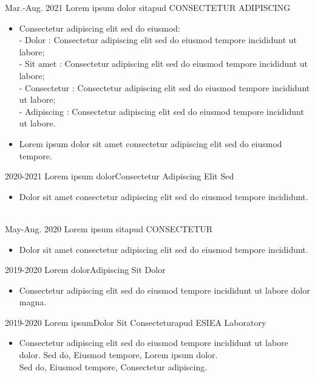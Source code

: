 %
%
%
\begin{experiences}
	\experience
	{Mar.-Aug. 2021} {Lorem ipsum dolor sit}{apud CONSECTETUR ADIPISCING}{} 
	{}{
		\begin{itemize}
			\item Consectetur adipiscing elit sed do eiusmod:
			\\- Dolor : Consectetur adipiscing elit sed do eiusmod tempore incididunt ut labore;
			\\- Sit amet : Consectetur adipiscing elit sed do eiusmod tempore incididunt ut labore;
			\\- Consectetur : Consectetur adipiscing elit sed do eiusmod tempore incididunt ut labore;
			\\- Adipiscing : Consectetur adipiscing elit sed do eiusmod tempore incididunt ut labore.
			\vspace{-0.3cm}\\
			\item Lorem ipsum dolor sit amet consectetur adipiscing elit sed do eiusmod tempore.
			\vspace{-0.25cm}\\
		\end{itemize}    
	} {}
	\experience
	{2020-2021} {Lorem ipsum dolor}{Consectetur Adipiscing Elit Sed}{}    
	{}{
		\begin{itemize}
			\item Dolor sit amet consectetur adipiscing elit sed do eiusmod tempore incididunt.
		\end{itemize}    
	} {}
	\vspace{-0.25cm}\\
	\experience
	{May-Aug. 2020} {Lorem ipsum sit}{apud CONSECTETUR}{}    
	{}{
		\begin{itemize}
			\item Dolor sit amet consectetur adipiscing elit sed do eiusmod tempore incididunt.
		\end{itemize}    
	} {}
	\experience
	{2019-2020} {Lorem dolor}{Adipiscing Sit Dolor}{}    
	{}{
		\begin{itemize}
			\item Consectetur adipiscing elit sed do eiusmod tempore incididunt ut labore dolor magna.
		\end{itemize}    
	} {}
	\experience
	{2019-2020} {Lorem ipsum}{Dolor Sit Consectetur}{apud ESIEA Laboratory}    
	{}{
		\begin{itemize}
			\item Consectetur adipiscing elit sed do eiusmod tempore incididunt ut labore dolor. Sed do, Eiusmod tempore, Lorem ipsum dolor.
			\\ Sed do, Eiusmod tempore, Consectetur adipiscing.
		\end{itemize}    
	} {}
	

\end{experiences}
